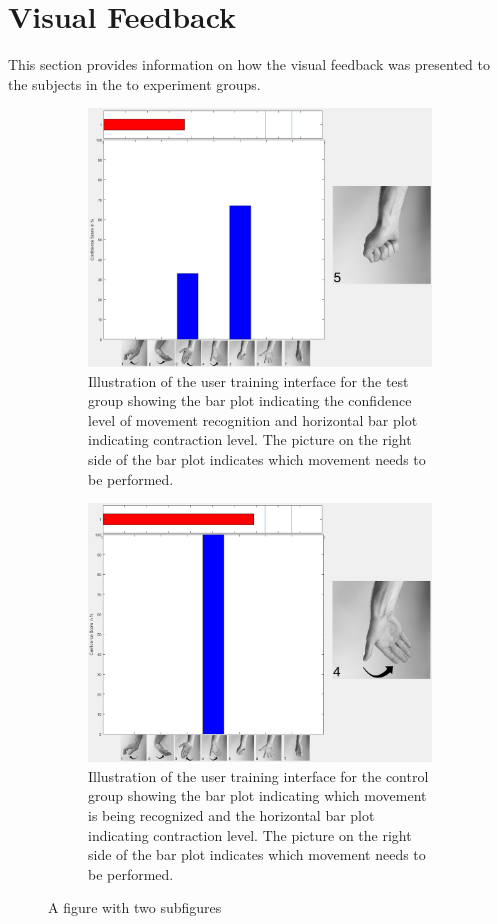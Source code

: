 %
\section{Visual Feedback}
This section provides information on how the visual feedback was presented to the subjects in the to experiment groups.

\begin{figure}[H] 
\centering
	\begin{subfigure}[b]{0.3\textwidth}
		\centering
		\includegraphics[width=.4\textwidth]{figures/xBackground/usertraintestGUI}  
		\caption{Illustration of the user training interface for the test group showing the bar plot indicating the confidence level of movement recognition and horizontal bar plot indicating contraction level. The picture on the right side of the bar plot indicates which movement needs to be performed.}
	\end{subfigure}                
	\begin{subfigure}[b]{0.3\textwidth}
		\centering
		\includegraphics[width=.4\textwidth]{figures/xBackground/usertraincontrolGUI}  
		\caption{Illustration of the user training interface for the control group showing the bar plot indicating which movement is being recognized and the horizontal bar plot indicating contraction level. The picture on the right side of the bar plot indicates which movement needs to be performed.}
	\end{subfigure}
	\caption{A figure with two subfigures}
    \label{fig:feedbackGUI}
\end{figure}

